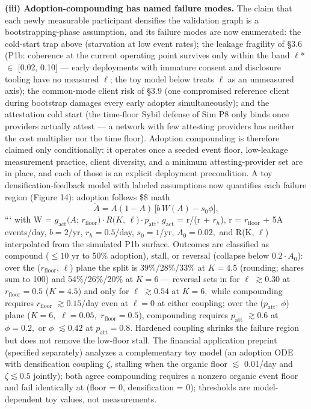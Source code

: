 \documentclass[
]{article}
\begin{document}
\textbf{(iii) Adoption-compounding has named failure modes.} The claim
that each newly measurable participant densifies the validation graph is
a bootstrapping-phase assumption, and its failure modes are now
enumerated: the cold-start trap above (starvation at low event rates);
the leakage fragility of §3.6 (P1b: coherence at the current operating
point survives only within the band \(\ell\)* \(\in\) {[}0.02, 0.10{]}
--- early deployments with immature consent and disclosure tooling have
no measured \(\ell\); the toy model below treats \(\ell\) as an
unmeasured axis); the common-mode client risk of §3.9 (one compromised
reference client during bootstrap damages every early adopter
simultaneously); and the attestation cold start (the time-floor Sybil
defense of Sim P8 only binds once providers actually attest --- a
network with few attesting providers has neither the cost multiplier nor
the time floor). Adoption compounding is therefore claimed only
conditionally: it operates once a seeded event floor, low-leakage
measurement practice, client diversity, and a minimum attesting-provider
set are in place, and each of those is an explicit deployment
precondition. A toy densification-feedback model with labeled
assumptions now quantifies each failure region (Figure 14): adoption
follows \$\$ math \begin{equation}
 \dot{A} = A(1-A)\,\bigl[b\,W(A) - s_0\phi\bigr], \label{eq:adopt}
\end{equation} ``` with W = \(g_{\mathrm{act}}(A\);
\(r_{\mathrm{floor}})\cdot R(K\), \(\ell)\cdot p_{\mathrm{att}}\),
\(g_{\mathrm{act}}\) = r/(r + \(r_h\)), r = \(r_{\mathrm{floor}}\) + 5A
events/day, \(b = 2\)/yr, \(r_h = 0.5\)/day, \(s_{0} = 1\)/yr,
\(A_{0} = 0.02,\) and R(K, \(\ell\)) interpolated from the simulated P1b
surface. Outcomes are classified as compound (\(\leq 10\) yr to 50\%
adoption), stall, or reversal (collapse below \(0.2\cdot A_{0}\)): over
the (\(r_{\mathrm{floor}}\), \(\ell\)) plane the split is 39\%/28\%/33\%
at \(K = 4.5\) (rounding; shares sum to 100) and 54\%/26\%/20\% at
\(K = 6\) --- reversal sets in for \(\ell\) \(\gtrsim 0.30\) at
\(r_{\mathrm{floor}} = 0.5\) (\(K = 4.5\)) and only for \(\ell\)
\(\gtrsim 0.54\) at \(K = 6,\) while compounding requires
\(r_{\mathrm{floor}}\) \(\gtrsim 0.15\)/day even at \(\ell = 0\) at
either coupling; over the (\(p_{\mathrm{att}}\), \(\phi\)) plane
(\(K = 6,\) \(\ell = 0.05,\) \(r_{\mathrm{floor}} = 0.5\)), compounding
requires \(p_{\mathrm{att}}\) \(\gtrsim 0.6\) at \(\phi = 0.2,\) or
\(\phi\) \(\lesssim 0.42\) at \(p_{\mathrm{att}} = 0.8.\) Hardened
coupling shrinks the failure region but does not remove the low-floor
stall. The financial application preprint (specified separately)
analyzes a complementary toy model (an adoption ODE with densification
coupling \(\zeta\), stalling when the organic floor \(\lesssim\)
0.01/day and \(\zeta \lesssim 0.5\) jointly); both agree compounding
requires a nonzero organic event floor and fail identically at (floor =
0, densification = 0); thresholds are model-dependent toy values, not
measurements.
\end{document}
